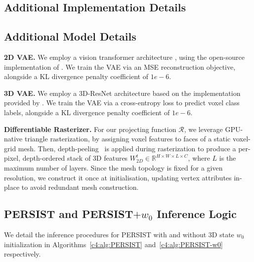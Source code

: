 \clearpage
\begin{subappendices}

\section{Additional Implementation Details}\label{c4:app:implt}


\subsection{Additional Model Details}

\textbf{2D VAE.} We employ a vision transformer architecture \cite{dosovitskiy2020image}, using the open-source implementation of \cite{decart2024oasis}. We train the VAE via an MSE reconstruction objective, alongside a KL divergence penalty coefficient of $1e-6$.

\textbf{3D VAE.} We employ a 3D-ResNet architecture based on the implementation provided by \cite{xiang2024structured}. We train the VAE via a cross-entropy loss to predict voxel class labels, alongside a KL divergence penalty coefficient of $1e-6$.

\textbf{Differentiable Rasterizer.} For our projecting function $\mathcal{R}$, we leverage GPU-native triangle rasterization, by assigning voxel features to faces of a static voxel-grid mesh. Then, depth-peeling~\cite{bavoil2008order, nagy2003depth} is applied during rasterization to produce a per-pixel, depth-ordered stack of 3D features $W_{2D}^{t} \in \mathbb{R}^{H \times W \times L \times C}$, where $L$ is the maximum number of layers. Since the mesh topology is fixed for a given resolution, we construct it once at initialisation, updating vertex attributes in-place to avoid redundant mesh construction.  

\subsection{PERSIST and PERSIST$+w_0$ Inference Logic}
We detail the inference procedures for PERSIST with and without 3D state $w_0$ initialization in
Algorithms~\ref{c4:alg:PERSIST} and~\ref{c4:alg:PERSIST-w0} respectively.


\end{subappendices}

